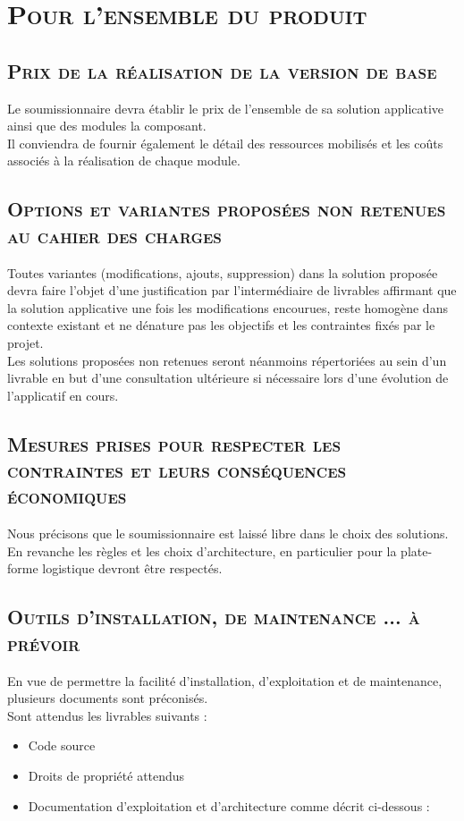 \section{\textsc{Pour l'ensemble du produit}}

\subsection{\textsc{Prix de la réalisation de la version de base}}
Le soumissionnaire devra établir le prix de l'ensemble de sa solution applicative ainsi que des modules la composant.
\\
Il conviendra de fournir également le détail des ressources mobilisés et les coûts associés à la réalisation de chaque module. 

\subsection{\textsc{Options et variantes proposées non retenues au cahier des charges}}
Toutes variantes (modifications, ajouts, suppression) dans la solution proposée devra faire l'objet d'une justification par l'intermédiaire de livrables affirmant que la solution applicative une fois les modifications encourues, reste homogène dans contexte existant et ne dénature pas les objectifs et les contraintes fixés par le projet.
\\
Les solutions proposées non retenues seront néanmoins répertoriées au sein d'un livrable en but d'une consultation ultérieure si nécessaire lors d'une évolution de l'applicatif en cours.

\subsection{\textsc{Mesures prises pour respecter les contraintes et leurs conséquences économiques}}
Nous précisons que le soumissionnaire est laissé libre dans le choix des solutions. En revanche les règles et les choix d'architecture, en particulier pour la plate-forme logistique devront être respectés.

\subsection{\textsc{Outils d'installation, de maintenance ... à prévoir}}
En vue de permettre la facilité d'installation, d'exploitation et de maintenance, plusieurs documents sont préconisés.
\\
Sont attendus les livrables suivants :
\begin{itemize}[label=\textbullet]
 \item Code source
 \item Droits de propriété attendus
 \item Documentation d'exploitation et d'architecture comme décrit ci-dessous :
\end{itemize}

